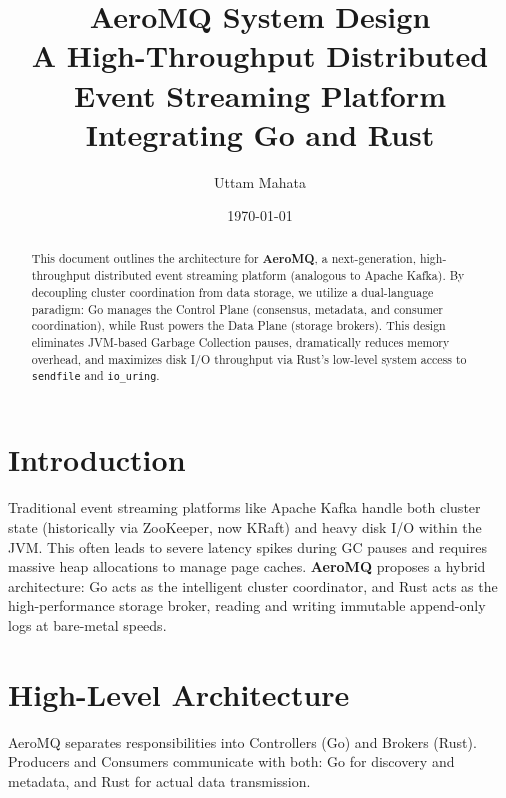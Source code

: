 \documentclass[11pt, a4paper]{article}
\title{\textbf{AeroMQ System Design} \\ \Large A High-Throughput Distributed Event Streaming Platform Integrating Go and Rust}
\author{Uttam Mahata}
\date{\today}
\begin{document}
\maketitle

\begin{abstract}
This document outlines the architecture for \textbf{AeroMQ}, a next-generation, high-throughput distributed event streaming platform (analogous to Apache Kafka). By decoupling cluster coordination from data storage, we utilize a dual-language paradigm: Go manages the Control Plane (consensus, metadata, and consumer coordination), while Rust powers the Data Plane (storage brokers). This design eliminates JVM-based Garbage Collection pauses, dramatically reduces memory overhead, and maximizes disk I/O throughput via Rust's low-level system access to \texttt{sendfile} and \texttt{io\_uring}.
\end{abstract}

\tableofcontents
\newpage

\section{Introduction}
Traditional event streaming platforms like Apache Kafka handle both cluster state (historically via ZooKeeper, now KRaft) and heavy disk I/O within the JVM. This often leads to severe latency spikes during GC pauses and requires massive heap allocations to manage page caches. \textbf{AeroMQ} proposes a hybrid architecture: Go acts as the intelligent cluster coordinator, and Rust acts as the high-performance storage broker, reading and writing immutable append-only logs at bare-metal speeds.

\section{High-Level Architecture}
AeroMQ separates responsibilities into Controllers (Go) and Brokers (Rust). Producers and Consumers communicate with both: Go for discovery and metadata, and Rust for actual data transmission.
\end{document}

